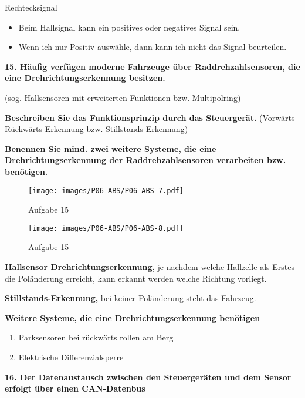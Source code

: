 Rechtecksignal

\begin{itemize}
\item
  Beim Hallsignal kann ein positives oder negatives Signal sein.
\item
  Wenn ich nur Positiv auswähle, dann kann ich nicht das Signal
  beurteilen.
\end{itemize}

\newpage

\textbf{15. Häufig verfügen moderne Fahrzeuge über Raddrehzahlsensoren,
die eine Drehrichtungserkennung besitzen.}

(sog. Hallsensoren mit erweiterten Funktionen bzw. Multipolring)

\textbf{Beschreiben Sie das Funktionsprinzip durch das Steuergerät.}
(Vorwärts-Rückwärts-Erkennung bzw. Stillstands-Erkennung)

\textbf{Benennen Sie mind. zwei weitere Systeme, die eine
Drehrichtungserkennung der Raddrehzahlsensoren verarbeiten bzw.
benötigen.}

\begin{figure}[!ht]%
\centering
\texttt{[image: images/P06-ABS/P06-ABS-7.pdf]}
\caption{Aufgabe 15}
\end{figure}

\begin{figure}[!ht]%
\centering
\texttt{[image: images/P06-ABS/P06-ABS-8.pdf]}
\caption{Aufgabe 15}
\end{figure}

\textbf{Hallsensor Drehrichtungserkennung,} je nachdem welche Hallzelle
als Erstes die Poländerung erreicht, kann erkannt werden welche Richtung
vorliegt.

\textbf{Stillstands-Erkennung,} bei keiner Poländerung steht das
Fahrzeug.

\textbf{Weitere Systeme, die eine Drehrichtungserkennung benötigen}

\begin{enumerate}
\item
  Parksensoren bei rückwärts rollen am Berg
\item
  Elektrische Differenzialsperre
\end{enumerate}

\newpage

\textbf{16. Der Datenaustausch zwischen den Steuergeräten und dem Sensor
erfolgt über einen CAN-Datenbus}

